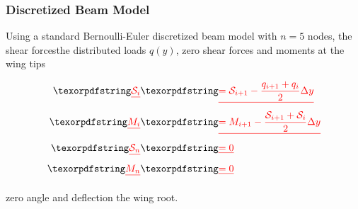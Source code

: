 \subsubsection{Discretized Beam Model}

Using a standard Bernoulli-Euler discretized beam model with $n=5$ nodes, the shear forces\DIFdelbegin {}\DIFdelend \DIFaddbegin {}\DIFaddend the distributed loads $q(y)$, \DIFdelbegin {}\DIFdelend \DIFaddbegin {}\DIFaddend zero shear forces and moments at the wing tips \DIFdelbegin {}%

\begin{eqnarray*}
    \DIFdel{\label{e:shear}
    \mathcal{S}_i }&\DIFdel{= \mathcal{S}_{i+1} - \frac{q_{i+1} + q_i}{2}\Delta y }\\
    \DIFdel{\label{e:moment}
    M_i }&\DIFdel{= M_{i+1} - \frac{\mathcal{S}_{i+1} + \mathcal{S}_i}{2}\Delta y }\\
    \DIFdel{\label{e:shearboundary}
    \mathcal{S}_n }&\DIFdel{= 0 }\\
    \DIFdel{\label{e:momentboundary}
    M_n }&\DIFdel{= 0
}\end{eqnarray*}

\DIFdelend \DIFaddbegin {}\DIFaddend zero angle and deflection \DIFdelbegin {}\DIFdelend \DIFaddbegin {}\DIFaddend the wing root.\cite{bending}

